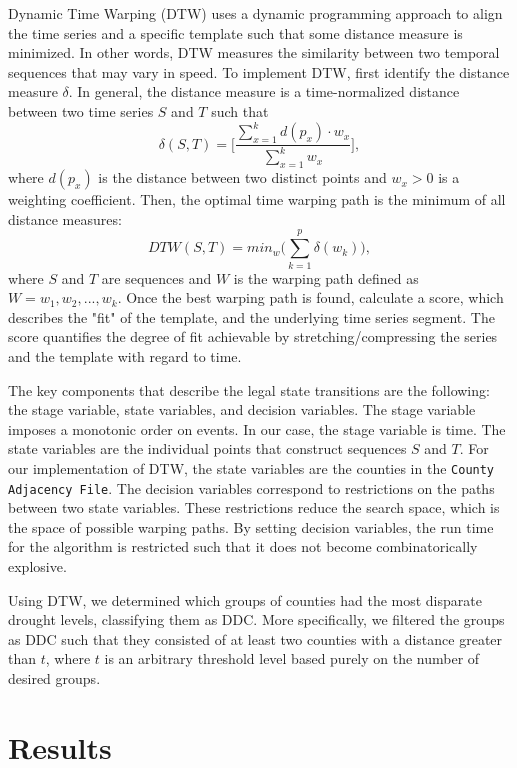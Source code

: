 \documentclass{article}
\begin{document}
Dynamic Time Warping (DTW) uses a dynamic programming approach to align the time series and a specific template such that some distance measure is minimized.\cite{Diersen:2002} In other words, DTW measures the similarity between two temporal sequences that may vary in speed. To implement DTW, first identify the distance measure $\delta$. In general, the distance measure is a time-normalized distance between two time series $S$ and $T$ such that
\begin{equation}
    \delta(S,T)=\bigg[\frac{\sum_{x=1}^kd(p_x)\cdot w_x}{\sum_{x=1}^kw_x}\bigg],
\end{equation}
where $d(p_x)$ is the distance between two distinct points and $w_x>0$ is a weighting coefficient. Then, the optimal time warping path is the minimum of all distance measures:
\begin{equation}
    DTW(S,T)=min_w\bigg(\sum_{k=1}^p\delta(w_k)\bigg),
\end{equation}
where $S$ and $T$ are sequences and $W$ is the warping path defined as $W=w_1,w_2,...,w_k$. Once the best warping path is found, calculate a score, which describes the "fit" of the template, and the underlying time series segment. The score quantifies the degree of fit achievable by stretching/compressing the series and the template with regard to time.\cite{Diersen:2002}

The key components that describe the legal state transitions are the following: the stage variable, state variables, and decision variables. The stage variable imposes a monotonic order on events. In our case, the stage variable is time. The state variables are the individual points that construct sequences $S$ and $T$. For our implementation of DTW, the state variables are the counties in the \texttt{County Adjacency File}. The decision variables correspond to restrictions on the paths between two state variables. These restrictions reduce the search space, which is the space of possible warping paths.\cite{Diersen:2002} By setting decision variables, the run time for the algorithm is restricted such that it does not become combinatorically explosive.

Using DTW, we determined which groups of counties had the most disparate drought levels, classifying them as DDC. More specifically, we filtered the groups as DDC such that they consisted of at least two counties with a distance greater than $t$, where $t$ is an arbitrary threshold level based purely on the number of desired groups.

\section{Results}
\end{document}
